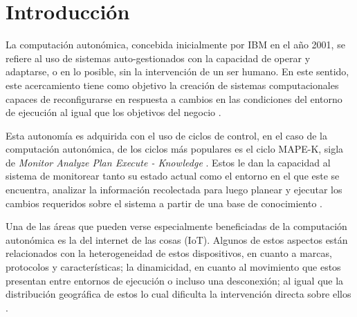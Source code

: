 \documentclass[12pt]{article}
\begin{document}
    



    \renewcommand{\contentsname}{\normalsize Contenido}
    \tableofcontents
    \newpage

    \renewcommand{\listfigurename}{\normalsize Lista de figuras}
    \listoffigures
    \newpage
    
    \renewcommand{\listtablename}{\normalsize Lista de tablas}    
    \listoftables
    \newpage

    \section*{Introducción}


    La computación autonómica, concebida inicialmente por IBM en el año 2001, se refiere al uso de sistemas auto-gestionados con la capacidad de operar y adaptarse, o en lo posible, sin la intervención de un ser humano. En este sentido, este acercamiento tiene como objetivo la creación de sistemas computacionales capaces de reconfigurarse en respuesta a cambios en las condiciones del entorno de ejecución al igual que los objetivos del negocio \cite{horn_2001}.

    Esta autonomía es adquirida con el uso de ciclos de control, en el caso de la computación autonómica, de los ciclos más populares es el ciclo MAPE-K, sigla de \textit{Monitor Analyze Plan Execute - Knowledge} \cite{Arcaini_2015}. Estos le dan la capacidad al sistema de monitorear tanto su estado actual como el entorno en el que este se encuentra, analizar la información recolectada para luego planear y ejecutar los cambios requeridos sobre el sistema a partir de una base de conocimiento \cite{RutanenKalle2018McoO}.
    
    Una de las áreas que pueden verse especialmente beneficiadas de la computación autonómica es la del internet de las cosas (IoT). Algunos de estos aspectos están relacionados con la heterogeneidad de estos dispositivos, en cuanto a marcas, protocolos y características; la dinamicidad, en cuanto al movimiento que estos presentan entre entornos de ejecución o incluso una desconexión; al igual que la distribución geográfica de estos lo cual dificulta la intervención directa sobre ellos \cite{Tahir_2019}. 
    
\end{document}
